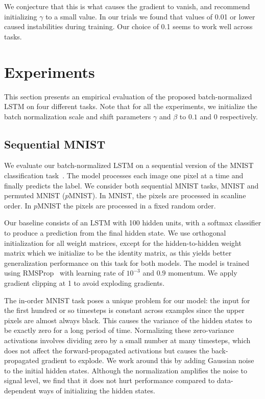 \documentclass{article} %
\begin{document}
We conjecture that this is what causes the gradient to vanish, and recommend initializing $\gamma$ to a small value.
In our trials we found that values of 0.01 or lower caused instabilities during training.
Our choice of 0.1 seems to work well across tasks.

\section{Experiments}
\label{sec:experiments}

This section presents an empirical evaluation of the proposed batch-normalized LSTM on four different tasks.
Note that for all the experiments, we initialize the batch normalization scale and shift parameters $\gamma$ and $\beta$ to $0.1$ and $0$ respectively.

\subsection{Sequential MNIST}
\label{sec:seqmnist}

We evaluate our batch-normalized LSTM on a sequential version of the MNIST classification task~\citep{le2015simple}.
The model processes each image one pixel at a time and finally predicts the label.
We consider both sequential MNIST tasks, MNIST and permuted MNIST ($p$MNIST).
In MNIST, the pixels are processed in scanline order.
In $p$MNIST the pixels are processed in a fixed random order.

Our baseline consists of an LSTM with 100 hidden units, with a softmax classifier to produce a prediction from the final hidden state.
We use orthogonal initialization for all weight matrices, except for the hidden-to-hidden weight matrix which we initialize to be the identity matrix,
as this yields better generalization performance on this task for both models.
The model is trained using RMSProp~\citep{rmsprop} with learning rate of $10^{-3}$ and $0.9$ momentum.
We apply gradient clipping at 1 to avoid exploding gradients.

The in-order MNIST task poses a unique problem for our model:
the input for the first hundred or so timesteps is constant across examples since the upper pixels are almost always black.
This causes the variance of the hidden states to be exactly zero for a long period of time.
Normalizing these zero-variance activations involves dividing zero by a small number at many timesteps, which does not affect the forward-propagated activations but causes the back-propagated gradient to explode.
We work around this by adding Gaussian noise to the initial hidden states.
Although the normalization amplifies the noise to signal level, we find that it does not hurt performance compared to data-dependent ways of initializing the hidden states.
\end{document}
